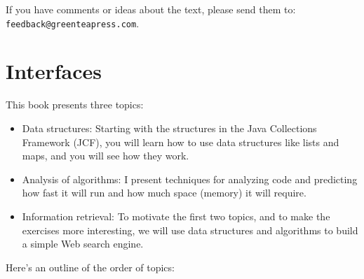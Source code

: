 \documentclass[12pt]{book}
\theoremstyle{exercise}
\begin{document}

If you have comments or ideas about the text, please send
them to: {\tt feedback@greenteapress.com}.


\mainmatter

\chapter{Interfaces}
\label{cs-lists-programming-to-an-interface-readme}


This book presents three topics:

\begin{itemize}

\item Data structures: Starting with the structures in the Java
Collections Framework (JCF), you will learn how to use data structures
like lists and maps, and you will see how they work.

\item Analysis of algorithms: I present techniques for analyzing
code and predicting how fast it will run and how much space (memory) it
will require.

\item Information retrieval: To motivate the first two topics, and to
make the exercises more interesting, we will use data structures and
algorithms to build a simple Web search engine.

\end{itemize}

Here's an outline of the order of topics:
\end{document}
